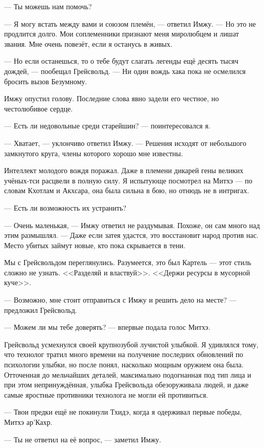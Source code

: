 --- Ты можешь нам помочь?

--- Я могу встать между вами и союзом племён, --- ответил Имжу.
--- Но это не продлится долго.
Мои соплеменники признают меня миролюбцем и лишат звания.
Мне очень повезёт, если я останусь в живых.

--- Но если останешься, то о тебе будут слагать легенды ещё десять тысяч дождей, --- пообещал Грейсвольд.
--- Ни один вождь хака пока не осмелился бросить вызов Безумному.

Имжу опустил голову.
Последние слова явно задели его честное, но честолюбивое сердце.

--- Есть ли недовольные среди старейшин? --- поинтересовался я.

--- Хватает, --- уклончиво ответил Имжу.
--- Решения исходят от небольшого замкнутого круга, члены которого хорошо мне известны.

Интеллект молодого вождя поражал.
Даже в племени дикарей гены великих учёных-тси расцвели в полную силу.
Я испытующе посмотрел на Митхэ --- по словам Кхотлам и Акхсара, она была сильна в бою, но отнюдь не в интригах.

--- Есть ли возможность их устранить?

--- Очень маленькая, --- Имжу ответил не раздумывая.
Похоже, он сам много над этим размышлял.
--- Даже если затея удастся, это восстановит народ против нас.
Место убитых займут новые, кто пока скрывается в тени.

Мы с Грейсвольдом переглянулись.
Разумеется, это был Картель --- этот стиль сложно не узнать.
<<Разделяй и властвуй>>.
<<Держи ресурсы в мусорной куче>>.

--- Возможно, мне стоит отправиться с Имжу и решить дело на месте? --- предложил Грейсвольд.

--- Можем ли мы тебе доверять? --- впервые подала голос Митхэ.

Грейсвольд усмехнулся своей крупнозубой лучистой улыбкой.
Я удивлялся тому, что технолог тратил много времени на получение последних обновлений по психологии улыбки, но после понял, насколько мощным оружием она была.
Отточенная до мельчайших деталей, максимально подогнанная под тип лица и при этом непринуждённая, улыбка Грейсвольда обезоруживала людей, и даже самые яростные противники технолога не могли ей противиться.

--- Твои предки ещё не покинули Тхидэ, когда я одерживал первые победы, Митхэ ар’Кахр.

--- Ты не ответил на её вопрос, --- заметил Имжу.

